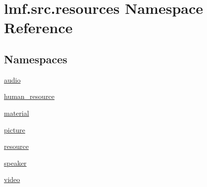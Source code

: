 \hypertarget{namespacelmf_1_1src_1_1resources}{\section{lmf.\+src.\+resources Namespace Reference}
\label{namespacelmf_1_1src_1_1resources}
}
\subsection*{Namespaces}
\begin{DoxyCompactItemize}
\item 
 \hyperlink{namespacelmf_1_1src_1_1resources_1_1audio}{audio}
\item 
 \hyperlink{namespacelmf_1_1src_1_1resources_1_1human__resource}{human\+\_\+resource}
\item 
 \hyperlink{namespacelmf_1_1src_1_1resources_1_1material}{material}
\item 
 \hyperlink{namespacelmf_1_1src_1_1resources_1_1picture}{picture}
\item 
 \hyperlink{namespacelmf_1_1src_1_1resources_1_1resource}{resource}
\item 
 \hyperlink{namespacelmf_1_1src_1_1resources_1_1speaker}{speaker}
\item 
 \hyperlink{namespacelmf_1_1src_1_1resources_1_1video}{video}
\end{DoxyCompactItemize}
